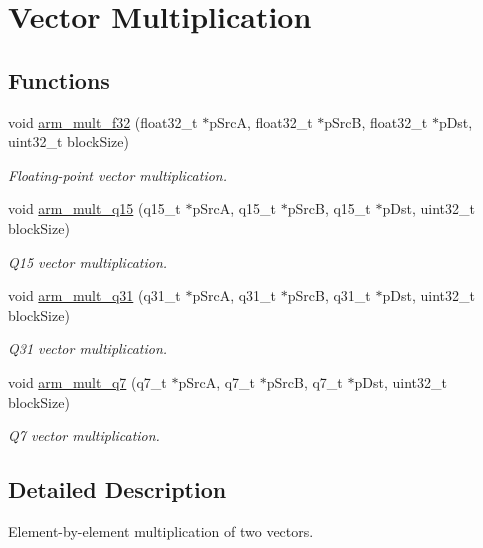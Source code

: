 \hypertarget{group___basic_mult}{\section{Vector Multiplication}
\label{group___basic_mult}
}
\subsection*{Functions}
\begin{DoxyCompactItemize}
\item 
void \hyperlink{group___basic_mult_gaca3f0b8227da431ab29225b88888aa32}{arm\-\_\-mult\-\_\-f32} (float32\-\_\-t $\ast$p\-Src\-A, float32\-\_\-t $\ast$p\-Src\-B, float32\-\_\-t $\ast$p\-Dst, uint32\-\_\-t block\-Size)
\begin{DoxyCompactList}\small\item\em Floating-\/point vector multiplication. \end{DoxyCompactList}\item 
void \hyperlink{group___basic_mult_gafb0778d27ed98a2a6f2ecb7d48cc8c75}{arm\-\_\-mult\-\_\-q15} (q15\-\_\-t $\ast$p\-Src\-A, q15\-\_\-t $\ast$p\-Src\-B, q15\-\_\-t $\ast$p\-Dst, uint32\-\_\-t block\-Size)
\begin{DoxyCompactList}\small\item\em Q15 vector multiplication. \end{DoxyCompactList}\item 
void \hyperlink{group___basic_mult_ga3528c0f54a0607acc603f0490d3ca6c6}{arm\-\_\-mult\-\_\-q31} (q31\-\_\-t $\ast$p\-Src\-A, q31\-\_\-t $\ast$p\-Src\-B, q31\-\_\-t $\ast$p\-Dst, uint32\-\_\-t block\-Size)
\begin{DoxyCompactList}\small\item\em Q31 vector multiplication. \end{DoxyCompactList}\item 
void \hyperlink{group___basic_mult_ga16677275ed83ff0878da531e875c27ef}{arm\-\_\-mult\-\_\-q7} (q7\-\_\-t $\ast$p\-Src\-A, q7\-\_\-t $\ast$p\-Src\-B, q7\-\_\-t $\ast$p\-Dst, uint32\-\_\-t block\-Size)
\begin{DoxyCompactList}\small\item\em Q7 vector multiplication. \end{DoxyCompactList}\end{DoxyCompactItemize}


\subsection{Detailed Description}
Element-\/by-\/element multiplication of two vectors.


